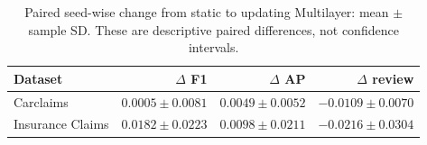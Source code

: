 \begin{table}[!htbp]\centering\footnotesize
\caption{Paired seed-wise change from static to updating Multilayer: mean $\pm$ sample SD. These are descriptive paired differences, not confidence intervals.}\label{tab:ablation}
\setlength{\tabcolsep}{2pt}
\begin{tabular}{lrrr}\toprule
Dataset & $\Delta$ F1 & $\Delta$ AP & $\Delta$ review\\\midrule
Carclaims & $0.0005 \pm 0.0081$ & $0.0049 \pm 0.0052$ & $-0.0109 \pm 0.0070$\\
Insurance Claims & $0.0182 \pm 0.0223$ & $0.0098 \pm 0.0211$ & $-0.0216 \pm 0.0304$\\
\bottomrule\end{tabular}
\end{table}
